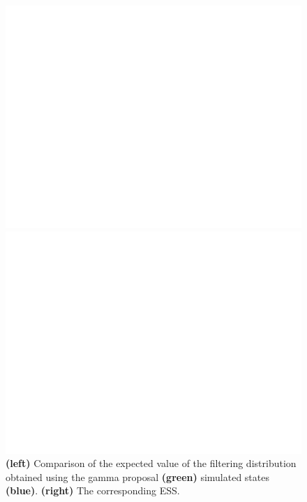 \documentclass{article}
\begin{document}
\begin{figure}[htb]
	\centering
	\begin{minipage}{.45\textwidth}
		\centering
		\includegraphics[width=0.97\linewidth]{bootstrap-filter/diagno_gamma.pdf}
	\end{minipage}
	\begin{minipage}{.45\textwidth}
		\centering
		\includegraphics[width=0.97\linewidth]{bootstrap-filter/ESS_gamma.pdf}
	\end{minipage}
	\caption{\textbf{(left)} Comparison of the expected value of the filtering distribution obtained using the gamma proposal \textbf{(green)} simulated states \textbf{(blue)}. \textbf{(right)} The corresponding ESS. }
	\label{fig:gamma}
\end{figure}
\end{document}
